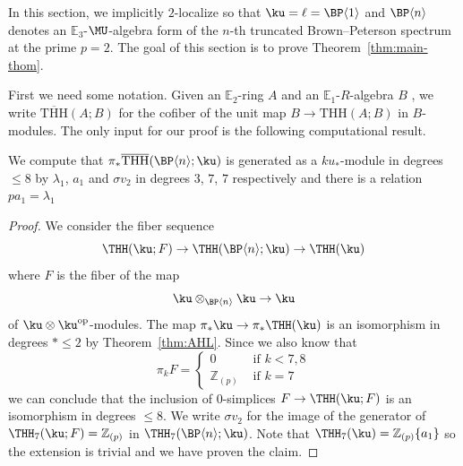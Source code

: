In this section, we implicitly $2$-localize so that $\ku=\ell=\BP\langle 1\rangle$ and $\BP\langle n\rangle$ denotes an $\mathbb{E}_3$-$\MU$-algebra form of the $n$-th truncated Brown--Peterson spectrum at the prime $p=2$. 
The goal of this section is to prove Theorem~\ref{thm:main-thom}. 

First we need some notation. Given an $\mathbb{E}_2$-ring $A$ and an $\mathbb{E}_1$-$R$-algebra $B$ , we write 
 $\overline{\mathrm{THH}}(A;B)$ for the cofiber of the unit map 
$B\to \mathrm{THH}(A;B)$ in $B$-modules. The only input for our proof is the following computational result. 

\begin{proposition}\label{prop-computational-input}
We compute that $\pi_*\overline{\mathrm{THH}}(\BP\langle n\rangle;\ku)$  is generated as a $ku_*$-module in degrees $\le 8$ by $\lambda_1$, $a_1$ and $\sigma v_2$ in degrees $3$, $7$, $7$ respectively and there is a relation $pa_1=\lambda_1$
\end{proposition}

\begin{proof}
We consider the fiber sequence  
\[ \THH(\ku;F) \to  \THH(\BP\langle n\rangle ; \ku )\to 
\THH(\ku) 
\]
where $F$ is the fiber of the map 
\[ \ku \otimes_{\BP\langle n \rangle }\ku \to \ku \]
of $\ku\otimes \ku^{\textup{op}}$-modules. 
The map $\pi_*\ku\to \pi_*\THH(\ku)$ is an isomorphism in degrees $*\le 2$ by Theorem~\ref{thm:AHL}. Since we also know that  
\[ 
\pi_k F = \begin{cases} 0 & \text{ if } k<7,8\\
           \mathbb{Z}_{(p)} &\text{ if } k=7  
\end{cases}
\]
we can conclude that the inclusion of $0$-simplices $F\to \THH(\ku;F)$ is an isomorphism in degrees $\le 8$. We write $\sigma v_2$ for the image of the generator of $\THH_{7}(\ku;F)=\mathbb{Z}_{(p)}$ in $\THH_7(\BP\langle n\rangle ;\ku)$. Note that $\THH_7(\ku)=\mathbb{Z}_{(p)}\{a_1\}$ so the extension is trivial and we have proven the claim. 
\end{proof}

